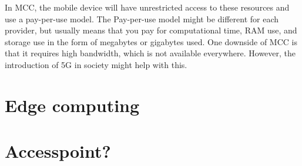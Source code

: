 In MCC, the mobile device will have unrestricted access to these resources and use a pay-per-use model. The Pay-per-use model might be different for each provider, but usually means that you pay for computational time, RAM use, and storage use in the form of megabytes or gigabytes used. One downside of MCC is that it requires high bandwidth, which is not available everywhere. However, the introduction of 5G in society might help with this.

\section{Edge computing}

\section{Accesspoint?}

